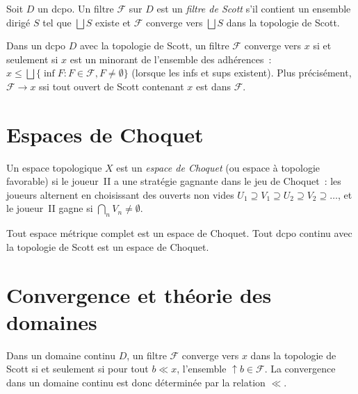 \begin{definition}
Soit $D$ un dcpo. Un filtre $\mathcal{F}$ sur $D$ est un \emph{filtre de Scott} s'il
contient un ensemble dirig\'e $S$ tel que $\bigsqcup S$ existe et $\mathcal{F}$ converge
vers $\bigsqcup S$ dans la topologie de Scott.
\end{definition}

\begin{proposition}
Dans un dcpo $D$ avec la topologie de Scott, un filtre $\mathcal{F}$ converge vers $x$ si
et seulement si $x$ est un minorant de l'ensemble des adh\'erences~:
$x \leq \bigsqcup\{\inf F : F \in \mathcal{F}, F \neq \emptyset\}$ (lorsque les infs et
sups existent). Plus pr\'ecis\'ement, $\mathcal{F} \to x$ ssi tout ouvert de Scott
contenant $x$ est dans $\mathcal{F}$.
\end{proposition}

\section{Espaces de Choquet}

\begin{definition}
Un espace topologique $X$ est un \emph{espace de Choquet} (ou espace \`a topologie
favorable) si le joueur~II a une strat\'egie gagnante dans le jeu de Choquet~: les joueurs
alternent en choisissant des ouverts non vides $U_1 \supseteq V_1 \supseteq U_2 \supseteq
V_2 \supseteq \ldots$, et le joueur~II gagne si $\bigcap_n V_n \neq \emptyset$.
\end{definition}

\begin{theoreme}
Tout espace m\'etrique complet est un espace de Choquet. Tout dcpo continu avec la
topologie de Scott est un espace de Choquet.
\end{theoreme}

\section{Convergence et th\'eorie des domaines}

\begin{proposition}
Dans un domaine continu $D$, un filtre $\mathcal{F}$ converge vers $x$ dans la topologie
de Scott si et seulement si pour tout $b \ll x$, l'ensemble $\uparrow\! b \in \mathcal{F}$.
La convergence dans un domaine continu est donc d\'etermin\'ee par la relation $\ll$.
\end{proposition}

